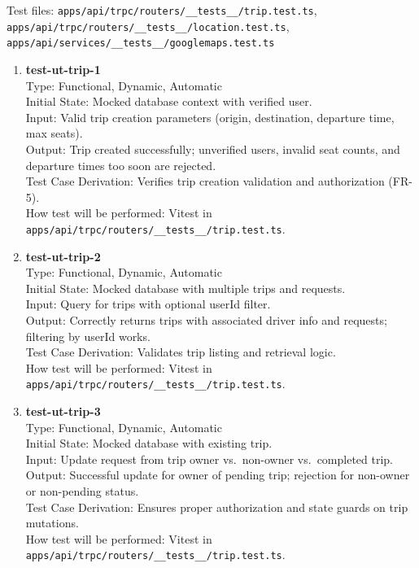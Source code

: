 \documentclass[12pt, titlepage]{article}
\begin{document}
Test files: \texttt{apps/api/trpc/routers/\_\_tests\_\_/trip.test.ts}, \texttt{apps/api/trpc/routers/\_\_tests\_\_/location.test.ts}, \texttt{apps/api/services/\_\_tests\_\_/googlemaps.test.ts}

\begin{enumerate}
\item \textbf{test-ut-trip-1}\\
Type: Functional, Dynamic, Automatic\\
Initial State: Mocked database context with verified user.\\
Input: Valid trip creation parameters (origin, destination, departure time, max seats).\\
Output: Trip created successfully; unverified users, invalid seat counts, and departure times too soon are rejected.\\
Test Case Derivation: Verifies trip creation validation and authorization (FR-5).\\
How test will be performed: Vitest in \texttt{apps/api/trpc/routers/\_\_tests\_\_/trip.test.ts}.\\

\item \textbf{test-ut-trip-2}\\
Type: Functional, Dynamic, Automatic\\
Initial State: Mocked database with multiple trips and requests.\\
Input: Query for trips with optional userId filter.\\
Output: Correctly returns trips with associated driver info and requests; filtering by userId works.\\
Test Case Derivation: Validates trip listing and retrieval logic.\\
How test will be performed: Vitest in \texttt{apps/api/trpc/routers/\_\_tests\_\_/trip.test.ts}.\\

\item \textbf{test-ut-trip-3}\\
Type: Functional, Dynamic, Automatic\\
Initial State: Mocked database with existing trip.\\
Input: Update request from trip owner vs.\ non-owner vs.\ completed trip.\\
Output: Successful update for owner of pending trip; rejection for non-owner or non-pending status.\\
Test Case Derivation: Ensures proper authorization and state guards on trip mutations.\\
How test will be performed: Vitest in \texttt{apps/api/trpc/routers/\_\_tests\_\_/trip.test.ts}.\\


\end{enumerate}
\end{document}
